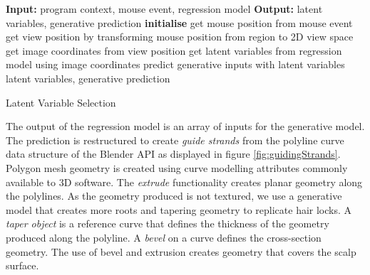 \documentclass[ %
author={Dillon Keith Diep},
supervisor={Dr. Carl Henrik Ek},
degree={MEng},
title={ART-CG Hair:},
subtitle={Assisted Real-time Content Generation of Stylised Virtual Hair},
type={Research},
year={2017} ]{dissertation}
\begin{document}
\begin{algorithm}[!h]
	\algrule
	\textbf{Input:} program context, mouse event, regression model\;
	\textbf{Output:} latent variables, generative prediction\;
	\algrule
	\textbf{initialise}\;
	{
		get mouse position from mouse event\;
		get view position by transforming mouse position from region to 2D view space\;
		get image coordinates from view position\;
		get latent variables from regression model using image coordinates\;
		predict generative inputs with latent variables\;
	}
	\Return latent variables, generative prediction
	\caption{Latent Variable Selection}
\end{algorithm}

The output of the regression model is an array of inputs for the generative model. The prediction is restructured to create \textit{guide strands} from the polyline curve data structure of the Blender API as displayed in figure \ref{fig:guidingStrands}. Polygon mesh geometry is created using curve modelling attributes commonly available to 3D software. The \textit{extrude} functionality creates planar geometry along the polylines. As the geometry produced is not textured, we use a generative model that creates more roots and tapering geometry to replicate hair locks.
A \textit{taper object} is a reference curve that defines the thickness of the geometry produced along the polyline. A \textit{bevel} on a curve defines the cross-section geometry. The use of bevel and extrusion creates geometry that covers the scalp surface.
\end{document}
